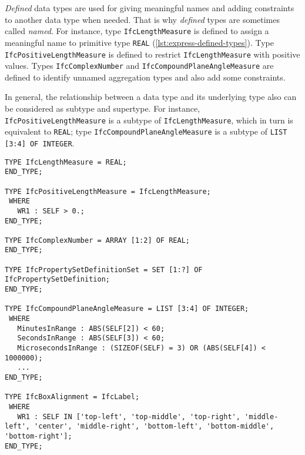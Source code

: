 \emph{Defined} data types are used for giving meaningful names and adding constraints to another data type when needed.
That is why \emph{defined} types are sometimes called \emph{named}.
For instance, type \texttt{Ifc\-Length\-Measure} is defined to assign a meaningful name to primitive type \texttt{REAL} (\autoref{lst:express-defined-types}).
Type \texttt{Ifc\-Positive\-Length\-Measure} is defined to restrict \texttt{Ifc\-Length\-Measure} with positive values.
Types \texttt{Ifc\-Complex\-Number} and \texttt{Ifc\-Compound\-Plane\-Angle\-Measure} are defined to identify unnamed aggregation types and also add some constraints.

In general, the relationship between a data type and its underlying type also can be considered as subtype and supertype.
For instance, \texttt{IfcPositiveLengthMeasure} is a subtype of \texttt{IfcLengthMeasure}, which in turn is equivalent to \texttt{REAL}; type \texttt{IfcCompoundPlaneAngleMeasure} is a subtype of \texttt{LIST [3:4] OF INTEGER}.



\begin{lstlisting}[caption={Printout of several defined data types},label=lst:express-defined-types]
TYPE IfcLengthMeasure = REAL;
END_TYPE;

TYPE IfcPositiveLengthMeasure = IfcLengthMeasure;
 WHERE
   WR1 : SELF > 0.;
END_TYPE;

TYPE IfcComplexNumber = ARRAY [1:2] OF REAL;
END_TYPE;

TYPE IfcPropertySetDefinitionSet = SET [1:?] OF IfcPropertySetDefinition;
END_TYPE;

TYPE IfcCompoundPlaneAngleMeasure = LIST [3:4] OF INTEGER;
 WHERE
   MinutesInRange : ABS(SELF[2]) < 60;
   SecondsInRange : ABS(SELF[3]) < 60;
   MicrosecondsInRange : (SIZEOF(SELF) = 3) OR (ABS(SELF[4]) < 1000000);
   ...
END_TYPE;

TYPE IfcBoxAlignment = IfcLabel;
 WHERE
   WR1 : SELF IN ['top-left', 'top-middle', 'top-right', 'middle-left', 'center', 'middle-right', 'bottom-left', 'bottom-middle', 'bottom-right'];
END_TYPE;
\end{lstlisting}


